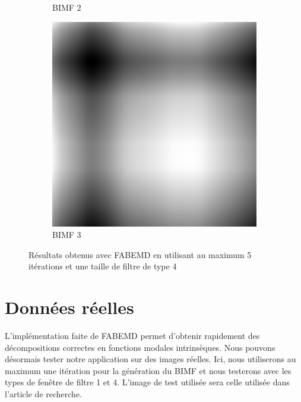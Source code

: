 \begin{figure}
\begin{subfigure}{.30\textwidth}
  \caption{BIMF 2}
\end{subfigure}
\begin{subfigure}{.30\textwidth}
  \centering
  \includegraphics[width=.9\linewidth]{img/s_5_4_3}
  \caption{BIMF 3}
\end{subfigure}
\caption{Résultats obtenus avec FABEMD en utilisant au maximum 5 itérations et une taille de filtre de type 4}
\label{fig:s_5_4}
\end{figure}

\section{Données réelles}

L'implémentation faite de FABEMD permet d'obtenir rapidement des décompositions correctes en fonctions modales intrinsèques. Nous pouvons désormais tester notre application sur des images réelles. Ici, nous utiliserons au maximum une itération pour la génération du BIMF et nous testerons avec les types de fenêtre de filtre 1 et 4. L'image de test utilisée sera celle utilisée dans l'article de recherche.

